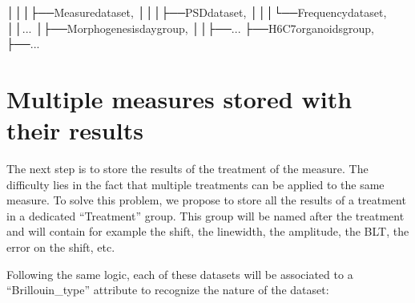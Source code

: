 \documentclass[letterpaper,10pt,english]{sphinxmanual}
\begin{document}
\begin{sphinxVerbatim}[commandchars=\\\{\}]
│││├──Measuredataset,
│││├──PSDdataset,
│││└──Frequencydataset,
││...
│├──Morphogenesisdaygroup,
││├──...
├──H6C7organoidsgroup,
├──...
\end{sphinxVerbatim}


\section{Multiple measures stored with their results}
\label{\detokenize{source/file_format:multiple-measures-stored-with-their-results}}
\sphinxAtStartPar
The next step is to store the results of the treatment of the measure. The difficulty lies in the fact that multiple treatments can be applied to the same measure. To solve this problem, we propose to store all the results of a treatment in a dedicated “Treatment” group. This group will be named after the treatment and will contain for example the shift, the linewidth, the amplitude, the BLT, the error on the shift, etc.

\sphinxAtStartPar
Following the same logic, each of these datasets will be associated to a “Brillouin\_type” attribute to recognize the nature of the dataset:
\end{document}
